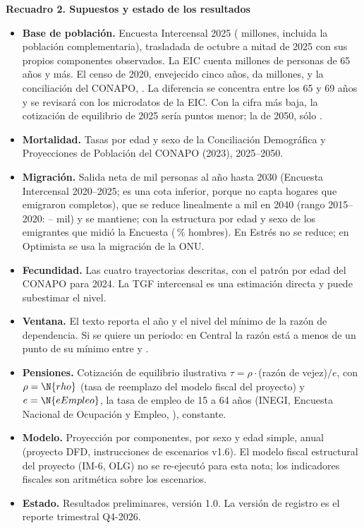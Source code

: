 \documentclass[10pt,a4paper]{article}
\newenvironment{recuadro}[1]
  {\par\vspace{2pt}\noindent\begin{lrbox}{\recbox}\begin{minipage}{\dimexpr\linewidth-2\fboxsep\relax}
   \setlength{\parskip}{2pt}\textbf{#1}\par}
  {\end{minipage}\end{lrbox}\colorbox{boxbg}{\usebox{\recbox}}\par\vspace{2pt}}
\begin{document}
\begin{recuadro}{Recuadro 2. Supuestos y estado de los resultados}
\scriptsize
\begin{itemize}
\item \textbf{Base de población.} Encuesta Intercensal 2025 ( millones, incluida la población
  complementaria), trasladada de octubre a mitad de 2025 con sus propios componentes observados.
  La EIC cuenta  millones de personas de 65 años y más. El censo de 2020, envejecido cinco
  años, da  millones, y la conciliación del CONAPO, . La diferencia se
  concentra entre los 65 y 69 años y se revisará con los microdatos de la EIC. Con la cifra más baja, la
  cotización de equilibrio de 2025 sería  puntos menor; la de 2050, sólo
  .
\item \textbf{Mortalidad.} Tasas por edad y sexo de la Conciliación Demográfica y Proyecciones de
  Población del CONAPO (2023), 2025--2050.
\item \textbf{Migración.} Salida neta de  mil personas al año hasta 2030 (Encuesta
  Intercensal 2020--2025; es una cota inferior, porque no capta hogares que emigraron completos), que
  se reduce linealmente a  mil en 2040 (rango 2015--2020: --
  mil) y se mantiene; con la estructura por edad y sexo de los emigrantes que midió la Encuesta
  (\,\% hombres). En Estrés no se reduce; en Optimista se usa la migración de la ONU.
\item \textbf{Fecundidad.} Las cuatro trayectorias descritas, con el patrón por edad del CONAPO para
  2024. La TGF intercensal es una estimación directa y puede subestimar el nivel.
\item \textbf{Ventana.} El texto reporta el año y el nivel del mínimo de la razón de dependencia. Si se
  quiere un periodo: en Central la razón está a menos de un punto de su mínimo entre
   y .
\item \textbf{Pensiones.} Cotización de equilibrio ilustrativa $\tau=\rho\cdot$(razón de vejez)$/e$, con
  $\rho=\N{rho}$ (tasa de reemplazo del modelo fiscal del proyecto) y $e=\N{eEmpleo}$, la tasa de empleo
  de 15 a 64 años (INEGI, Encuesta Nacional de Ocupación y Empleo, ), constante.
\item \textbf{Modelo.} Proyección por componentes, por sexo y edad simple, anual (proyecto DFD,
  instrucciones de escenarios v1.6). El modelo fiscal estructural del proyecto (IM-6, OLG) no se
  re-ejecutó para esta nota; los indicadores fiscales son aritmética sobre los escenarios.
\item \textbf{Estado.} Resultados preliminares, versión 1.0. La versión de registro es el reporte
  trimestral Q4-2026.
\end{itemize}
\end{recuadro}
\end{document}
